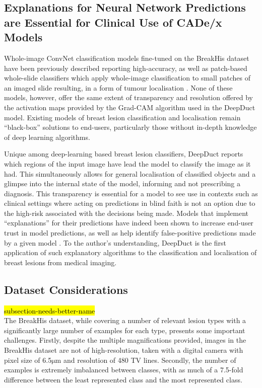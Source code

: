 \subsection{Explanations for Neural Network Predictions are Essential for Clinical Use of CADe/x Models}

Whole-image ConvNet classification models fine-tuned on the BreakHis dataset have been previously described reporting high-accuracy, as well as patch-based whole-slide classifiers which apply whole-image classification to small patches of an imaged slide resulting, in a form of tumour localisation \citep{han2017, wang2016}. None of these models, however, offer the same extent of transparency and resolution offered by the activation maps provided by the Grad-CAM algorithm used in the DeepDuct model. Existing models of breast lesion classification and localisation remain ``black-box'' solutions to end-users, particularly those without in-depth knowledge of deep learning algorithms.\par

Unique among deep-learning based breast lesion classifiers, DeepDuct reports which regions of the input image have lead the model to classify the image as it had. This simultaneously allows for general localisation of classified objects and a glimpse into the internal state of the model, informing and not prescribing a diagnosis. This transparency is essential for a model to see use in contexts such as clinical settings where acting on predictions in blind faith is not an option due to the high-risk associated with the decisions being made. Models that implement ``explanations'' for their predictions have indeed been shown to increase end-user trust in model predictions, as well as help identify false-positive predictions made by a given model \citep{ribeiro2016}. To the author's understanding, DeepDuct is the first application of such explanatory algorithms to the classification and localisation of breast lesions from medical imaging.\par

\subsection{Dataset Considerations}
\hl{subsection-needs-better-name}\\
The BreakHis dataset, while covering a number of relevant lesion types with a significantly large number of examples for each type, presents some important challenges. Firstly, despite the multiple magnifications provided, images in the BreakHis dataset are not of high-resolution, taken with a digital camera with pixel size of 6.5$\mathrm{\mu m}$ and resolution of 480 TV lines. Secondly, the number of examples is extremely imbalanced between classes, with as much of a 7.5-fold difference between the least represented class and the most represented class.\par

